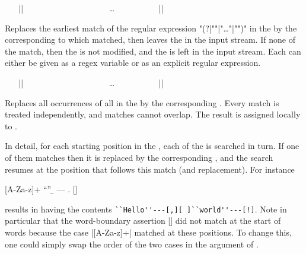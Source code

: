 \documentclass[oneside]{book}
\begin{document}
\begin{function}{\regexReplaceCaseOnceTF}
\begin{syntax}
~ ~ |{|
~ ~ ~ ~  
~ ~ ~ ~  
~ ~ ~ ~ \ldots
~ ~ ~ ~  
~ ~ |}| 
~ ~  
\end{syntax}
Replaces the earliest match of the regular expression
"(?|""|"\dots"|"")" in the 
by the  corresponding to which
 matched, then leaves the  in the
input stream.  If none of the  match, then the
 is not modified, and the  is left in
the input stream.  Each  can either be given as a regex
variable or as an explicit regular expression.
\end{function}

\begin{function}{\regexReplaceCaseAll}
\begin{syntax}
~ ~ |{|
~ ~ ~ ~  
~ ~ ~ ~  
~ ~ ~ ~ \ldots
~ ~ ~ ~  
~ ~ |}| 
\end{syntax}
Replaces all occurrences of all  in the 
by the corresponding . Every match is
treated independently, and matches cannot overlap. The result is
assigned locally to .
\par
In detail, for each starting position in the , each
of the  is searched in turn.  If one of them matches
then it is replaced by the corresponding , and the
search resumes at the position that follows this match (and
replacement).  For instance
\begin{codehigh}
\tlSet {}
\regexReplaceCaseAll
  {
    {[A-Za-z]+} {``\0''}
    {\b} {---}
    {.} {[\0]}
  } \lTmpaTl
\end{codehigh}
results in  having the contents
\verb*|``Hello''---[,][ ]``world''---[!]|.  Note in particular that
the word-boundary assertion |\b| did not match at the start of words
because the case |[A-Za-z]+| matched at these positions.  To change
this, one could simply swap the order of the two cases in the
argument of .
\end{function}
\end{document}
